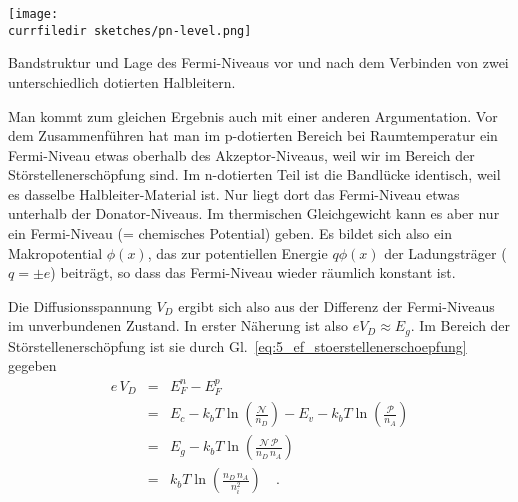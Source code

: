 \begin{marginfigure}
    \texttt{[image: \\currfiledir sketches/pn-level.png]}
    \caption{Bandstruktur und Lage des Fermi-Niveaus vor und nach dem Verbinden  von zwei unterschiedlich dotierten Halbleitern.}
\end{marginfigure}

Man kommt zum gleichen Ergebnis auch mit einer anderen Argumentation. Vor dem Zusammenführen hat man im p-dotierten Bereich bei Raumtemperatur ein Fermi-Niveau etwas oberhalb des Akzeptor-Niveaus, weil wir im Bereich der Störstellenerschöpfung sind. Im n-dotierten Teil ist die Bandlücke identisch, weil es dasselbe Halbleiter-Material ist. Nur liegt dort das Fermi-Niveau  etwas unterhalb der Donator-Niveaus. Im thermischen Gleichgewicht kann es aber nur ein Fermi-Niveau (= chemisches Potential) geben. Es bildet sich also ein Makropotential $\phi(x)$, das zur potentiellen Energie $q \phi(x)$ der Ladungsträger ($q = \pm e$) beiträgt, so dass das Fermi-Niveau wieder räumlich konstant ist. 


Die Diffusionsspannung $V_D$ ergibt sich also aus der Differenz der Fermi-Niveaus im unverbundenen Zustand. In erster Näherung ist also $e V_D \approx E_g$. Im Bereich der Störstellenerschöpfung ist sie durch Gl.~\ref{eq:5_ef_stoerstellenerschoepfung} gegeben
\begin{eqnarray}
    e \, V_D &= & E_F^n - E_F^p \\
    & =&   E_c - k_b T \ln \left( \frac{\mathcal{N}}{n_D} \right) - 
    E_v - k_b T \ln \left( \frac{\mathcal{P}}{n_A} \right) \\
   & =& E_g -  k_b T \ln \left( \frac{\mathcal{N \, P}}{n_D \, n_A} \right) \\
   & = & k_b T \ln \left( \frac{n_D \, n_A}{n_i^2} \right)  \quad .
\end{eqnarray}

